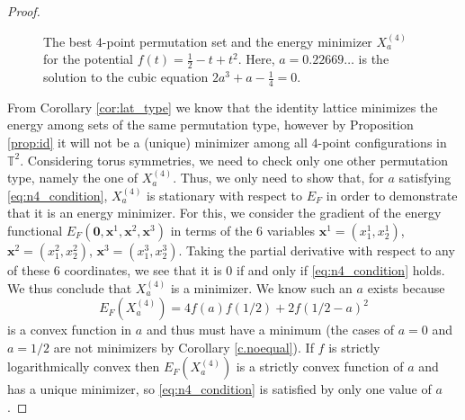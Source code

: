 \documentclass[a4paper,12pt]{article}
\numberwithin{equation}{section}
\theoremstyle{definition}
\newcommand{\bx}{\mathbf{x}}
\newcommand{\bbT}{\mathbb{T}}
\begin{document}
\begin{proof}
\begin{figure}[htp]
\caption{The best $4$-point permutation set and the energy minimizer $X_a^{(4)}$ for the potential $f(t) = \frac12 - t + t^2$. Here, $a = 0.22669\dots$ is the solution to the cubic equation $2a^3+a-\frac14=0$.}
\label{fig:four_configs}
\end{figure}

    From Corollary \ref{cor:lat_type} we know that the identity lattice minimizes the energy among sets of the same permutation type, however by Proposition \ref{prop:id} it will not be a (unique) minimizer among all $4$-point configurations in $\bbT^2$. Considering torus symmetries, we need to check only one other permutation type, namely the one of $X_a^{(4)}$. Thus, we only need to show that, for $a$ satisfying \eqref{eq:n4_condition}, $X_a^{(4)}$ is stationary with respect to $E_F$ in order to demonstrate  that it is an energy minimizer. For this, we consider the gradient of the energy functional $E_F(\mathbf 0, \bx^1, \bx^2, \bx^3)$ in terms of the $6$ variables $\bx^1 = (x_1^1, x_2^1)$, $\bx^2=(x_1^2, x_2^2)$, $\bx^3=(x_1^3, x_2^3)$. Taking the partial derivative with respect to any of these $6$ coordinates, we see that it is $0$ if and only if \eqref{eq:n4_condition} holds. We thus conclude that $X_a^{(4)}$ is a minimizer. We know such an $a$ exists because $$E_F(X_a^{(4)})=4f(a)f(1/2)+2f(1/2-a)^2$$ is a convex function in $a$ and thus must have a minimum (the cases of $a=0$ and $a=1/2$ are not minimizers by Corollary \ref{c.noequal}). If $f$ is strictly logarithmically convex then $E_F(X_a^{(4)})$ is a strictly convex function of $a$ and has a unique minimizer, so \eqref{eq:n4_condition} is satisfied by only one value of $a$.
\end{proof}
\end{document}
